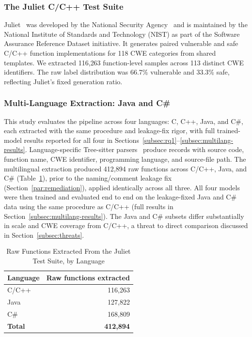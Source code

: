 \documentclass{ieeeaccess}
\begin{document}
\subsubsection{The Juliet C/C++ Test Suite}
\label{par:juliet-cpp}
Juliet~\cite{ref11} was developed by the National Security Agency~\cite{ref27} and is maintained by the National Institute of Standards and Technology (NIST) as part of the Software Assurance Reference Dataset initiative. It generates paired vulnerable and safe C/C++ function implementations for 118 CWE categories from shared templates. We extracted 116{,}263 function-level samples across 113 distinct CWE identifiers. The raw label distribution was 66.7\% vulnerable and 33.3\% safe, reflecting Juliet's fixed generation ratio.

\subsubsection{Multi-Language Extraction: Java and C\#}
\label{par:multilang}
This study evaluates the pipeline across four languages: C, C++, Java, and C\#, each extracted with the same procedure and leakage-fix rigor, with full trained-model results reported for all four in Sections~\ref{subsec:rq1}--\ref{subsec:multilang-results}. Language-specific Tree-sitter parsers~\cite{ref28} produce records with source code, function name, CWE identifier, programming language, and source-file path. The multilingual extraction produced 412{,}894 raw functions across C/C++, Java, and C\# (Table~\ref{tab:raw-functions}), prior to the naming/comment leakage fix (Section~\ref{par:remediation}), applied identically across all three. All four models were then trained and evaluated end to end on the leakage-fixed Java and C\# data using the same procedure as C/C++ (full results in Section~\ref{subsec:multilang-results}). The Java and C\# subsets differ substantially in scale and CWE coverage from C/C++, a threat to direct comparison discussed in Section~\ref{subsec:threats}.

\begin{table}[t]
\centering
\caption{Raw Functions Extracted From the Juliet Test Suite, by Language}
\label{tab:raw-functions}
\begin{tabular}{@{}lr@{}}
\toprule
\textbf{Language} & \textbf{Raw functions extracted} \\
\midrule
C/C++ & 116{,}263 \\
Java  & 127{,}822 \\
C\#   & 168{,}809 \\
\midrule
\textbf{Total} & \textbf{412{,}894} \\
\bottomrule
\end{tabular}
\end{table}
\end{document}
